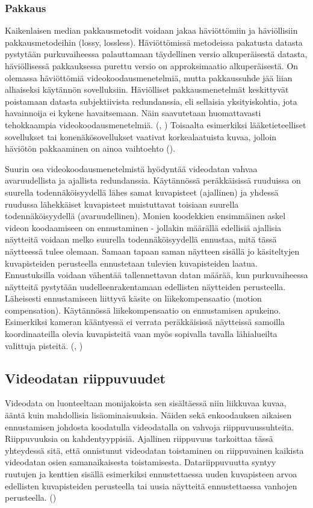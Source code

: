 \subsubsection{Pakkaus}

Kaikenlaisen median pakkausmetodit voidaan jakaa häviöttömiin
ja häviöllisiin pakkausmetodeihin (lossy, lossless). Häviöttömissä metodeissa pakatusta datasta
pystytään purkuvaiheessa palauttamaan täydellinen versio alkuperäisestä
datasta, häviöllisessä pakkauksessa purettu versio on approksimaatio
alkuperäisestä. On olemassa häviöttömiä videokoodausmenetelmiä, mutta
pakkaussuhde jää liian alhaiseksi käytännön sovelluksiin. Häviölliset
pakkausmenetelmät keskittyvät poistamaan datasta subjektiivista redundanssia,
eli sellaisia yksityiskohtia, jota havainnoija ei kykene havaitsemaan. Näin
saavutetaan huomattavasti tehokkaampia videokoodausmenetelmiä. (\citealt{h264}, \citealt{du})
Toisaalta esimerkiksi lääketieteelliset sovellukset tai konenäkösovellukset
vaativat korkealaatuista kuvaa, jolloin häviötön pakkaaminen on ainoa
vaihtoehto (\citealt{xu}).

Suurin osa videokoodausmenetelmistä hyödyntää videodatan vahvaa
avaruudellista ja ajallista redundanssia. Käytännössä peräkkäisissä
ruuduissa on suurella todennäköisyydellä lähes samat kuvapisteet (ajallinen) ja
yhdessä ruudussa lähekkäiset kuvapisteet muistuttavat toisiaan suurella
todennäköisyydellä (avaruudellinen). Monien koodekkien ensimmäinen askel videon koodaamiseen
on ennustaminen - jollakin määrällä edellisiä ajallisia näytteitä voidaan
melko suurella todennäköisyydellä ennustaa, mitä tässä näytteessä tulee
olemaan. Samaan tapaan saman näytteen sisällä jo käsiteltyjen kuvapisteiden
perusteella ennustetaan tulevien kuvapisteiden laatua. Ennustuksilla voidaan
vähentää tallennettavan datan määrää, kun purkuvaiheessa näytteitä pystytään
uudelleenrakentamaan edellisten näytteiden perusteella. Läheisesti
ennustamiseen liittyvä käsite on liikekompensaatio (motion compensation).
Käytännössä liikekompensaatio on ennustamisen apukeino. Esimerkiksi kameran
kääntyessä ei verrata peräkkäisissä näytteissä samoilla koordinaateilla
olevia kuvapisteitä vaan myös sopivalla tavalla lähialueilta valittuja
pisteitä. (\citealt{h264}, \citealt{du})

\subsection{Videodatan riippuvuudet}

Videodata on luonteeltaan monijakoista sen sisältäessä niin liikkuvaa kuvaa,
ääntä kuin mahdollisia lisäominaisuuksia. Näiden sekä
enkoodauksen aikaisen ennustamisen johdosta koodatulla videodatalla on vahvoja
riippuvuussuhteita. Riippuvuuksia on kahdentyyppisiä. Ajallinen riippuvuus
tarkoittaa tässä yhteydessä sitä, että onnistunut videodatan
toistaminen on riippuvainen kaikista videodatan osien samanaikaisesta
toistamisesta. Datariippuvuutta syntyy ruutujen ja kenttien
sisällä esimerkiksi ennustettaessa uuden kuvapisteen arvoa edellisten
kuvapisteiden perusteella tai uusia näytteitä ennustettaessa  vanhojen
perusteella. (\citealt{mujal})

